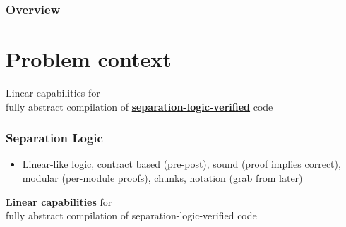 \documentclass{beamer}
\begin{document}
\begin{frame}
\end{frame}

\begin{frame}
\frametitle{Overview} %
\tableofcontents %
\end{frame}

\section{Problem context}

\begin{frame}[plain,c]

\begin{center}
\Huge Linear capabilities for\\  fully abstract
compilation of \textbf{\underline{separation-logic-verified}} code
\end{center}
\end{frame}


\begin{frame}
\frametitle{Separation Logic} 
\begin{itemize}
\item Linear-like logic, contract based (pre-post), sound (proof implies correct), modular (per-module proofs), chunks, notation (grab from later)
\end{itemize}
\end{frame}


\begin{frame}[plain,c]

\begin{center}
\Huge \underline{\textbf{Linear capabilities}} for\\  fully abstract
compilation of separation-logic-verified code
\end{center}

\end{frame}


\end{document}
